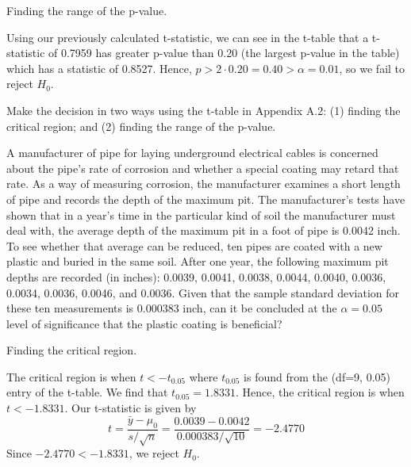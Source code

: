 \documentclass{article}
\begin{document}
\begin{probset}
\begin{prob}[\textbf{7.4.20}]
\begin{subprobset}
    \begin{subprob}
        Finding the range of the p-value.

        \begin{soln}
            Using our previously calculated t-statistic, we can see in the t-table that a t-statistic of 0.7959 has greater p-value than 0.20 (the largest p-value in the table) which has a statistic of 0.8527. Hence, $p > 2 \cdot 0.20 = 0.40 > \alpha = 0.01$, so we fail to reject $H_0$.
        \end{soln}
    \end{subprob}
    \end{subprobset}
\end{prob}

\newpage

\begin{prob}[\textbf{7.4.21}]
    Make the decision in two ways using the t-table in Appendix A.2: (1) finding the critical region; and (2) finding the range of the p-value.
    
    A manufacturer of pipe for laying underground electrical cables is concerned about the pipe's rate of corrosion and whether a special coating may retard that rate. As a way of measuring corrosion, the manufacturer examines a short length of pipe and records the depth of the maximum pit. The manufacturer's tests have shown that in a year's time in the particular kind of soil the manufacturer must deal with, the average depth of the maximum pit in a foot of pipe is 0.0042 inch. To see whether that average can be reduced, ten pipes are coated with a new plastic and buried in the same soil. After one year, the following maximum pit depths are recorded (in inches): 0.0039, 0.0041, 0.0038, 0.0044, 0.0040, 0.0036, 0.0034, 0.0036, 0.0046, and 0.0036. Given that the sample standard deviation for these ten measurements is 0.000383 inch, can it be concluded at the $\alpha = 0.05$ level of significance that the plastic coating is beneficial?

    \begin{subprobset}
    \begin{subprob}
        Finding the critical region.
        
        \begin{soln}
            The critical region is when $t < -t_{0.05}$ where $t_{0.05}$ is found from the (df=9, 0.05) entry of the t-table. We find that $t_{0.05} = 1.8331$. Hence, the critical region is when $t < -1.8331$. Our t-statistic is given by
            \[
                t = \frac{\bar{y} - \mu_0}{s/\sqrt{n}} = \frac{0.0039 - 0.0042}{0.000383/\sqrt{10}} = -2.4770
            \]
            Since $-2.4770 < -1.8331$, we reject $H_0$.
        \end{soln}
    \end{subprob}


\end{subprobset}
\end{prob}
\end{probset}
\end{document}

